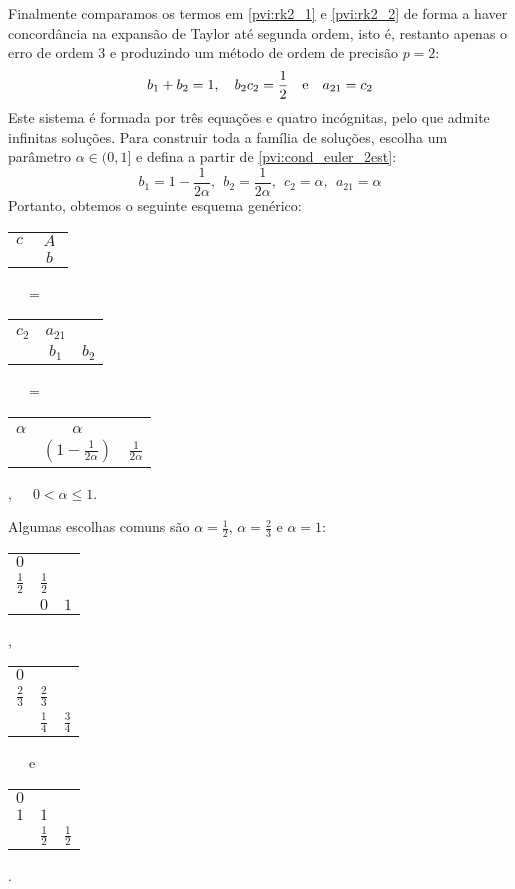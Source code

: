 Finalmente comparamos os termos em \eqref{pvi:rk2_1} e \eqref{pvi:rk2_2} de forma a haver concordância na expansão de Taylor até segunda ordem, isto é, restanto apenas o erro de ordem 3 e produzindo um método de ordem de precisão $p=2$:
\begin{eqnarray}\label{pvi:cond_euler_2est}
  b_1+b_2=1, \quad b_2c_2 = \frac{1}{2} \quad \hbox{e} \quad a_{21}=c_2
\end{eqnarray}
Este sistema é formada por três equações e quatro incógnitas, pelo que admite infinitas soluções. Para construir toda a família de soluções, escolha um parâmetro $\alpha\in (0,1] $ e defina a partir de \eqref{pvi:cond_euler_2est}:
$$b_1=1-\frac{1}{2\alpha},~~b_2=\frac{1}{2\alpha},~~c_2=\alpha,~~a_{21}=\alpha $$
Portanto, obtemos o seguinte esquema genérico:
\begin{center}
\begin{tabular}{c|cc}
  \multirow{2}{*}{$c$}    &  \multicolumn{2}{c}{\multirow{2}{*}{$A$}} 	     \\
                          &  \multicolumn{2}{c}{}                            \\ 
  \hline
                          & \multicolumn{2}{c}{$~~b~~$}   
\end{tabular}
~~~=~~~
\begin{tabular}{c|cc}
   &   &   \\
  $c_2$ & $a_{21}$ &   \\  \hline
      & $b_1$ &$b_2$
\end{tabular}
~~~=~~~
\begin{tabular}{c|cc}
   &   &   \\
  $\alpha$ & $\alpha$ &   \\  \hline
      & $\left(1-\frac{1}{2\alpha}\right)$ &$\frac{1}{2\alpha}$
\end{tabular},~~~$0<\alpha\leq 1$.
\end{center}
 Algumas escolhas comuns são $\alpha=\frac{1}{2}$, $\alpha=\frac{2}{3}$ e $\alpha=1$:
\begin{center}
\begin{tabular}{c|cc}
  $0$ &     &   \\
  $\frac{1}{2}$ & $\frac{1}{2}$ &   \\  \hline
      & $0$ & $1$
\end{tabular},\hphantom{~~~e~~~}
\begin{tabular}{c|cc}
  $0$ &   &   \\
  $\frac{2}{3}$ & $\frac{2}{3}$ &   \\  \hline
    & $\frac{1}{4}$ & $\frac{3}{4}$
\end{tabular} ~~~e~~~
\begin{tabular}{c|cc}
  $0$ &   &   \\
  $1$ & $1$ &   \\  \hline
      & $\frac{1}{2}$ &$\frac{1}{2}$
\end{tabular}.
\end{center}

